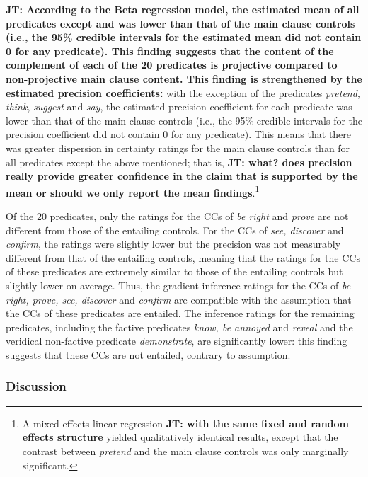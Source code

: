\documentclass[11pt,fleqn]{article}
\newcommand{\6}{\mbox{$[\hspace*{-.6mm}[$}}
\newcommand{\9}{\mbox{$]\hspace*{-.6mm}]$}}
\newcommand{\jt}[1]{\textbf{\color{blue}JT: #1}}
\begin{document}
\jt{According to the Beta regression model, the estimated mean of all predicates except {\em } and {\em } was lower than that of the main clause controls (i.e., the 95\% credible intervals for the estimated mean did not contain 0 for any predicate). This finding suggests that the content of the complement of each of the 20 predicates is projective compared to non-projective main clause content. This finding is strengthened by the estimated precision coefficients:} with the exception of the predicates \emph{pretend},  \emph{think}, \emph{suggest} and \emph{say}, the estimated precision coefficient for each predicate was lower than that of the main clause controls (i.e., the 95\% credible intervals for the precision coefficient did not contain 0 for any predicate). This means that there was greater dispersion in certainty ratings for the main clause controls than for all predicates except the above mentioned; that is, \jt{what? does precision really provide greater confidence in the claim that is supported by the mean or should we only report the mean findings}.\footnote{A mixed effects linear regression \jt{with the same fixed and random effects structure} yielded qualitatively identical results, except that the contrast between \emph{pretend} and the main clause controls was only marginally significant.} 

Of the 20 predicates, only the ratings for the CCs of {\em be right} and {\em prove} are not different from those of the entailing controls. For the CCs of {\em see, discover} and {\em confirm}, the ratings were slightly lower but the precision was not measurably different from that of the entailing controls, meaning that the ratings for the CCs of these predicates are extremely similar to those of the entailing controls but slightly lower on average. Thus, the gradient inference ratings for the CCs of {\em be right, prove, see, discover} and {\em confirm} are compatible with the assumption that the CCs of these predicates are entailed. The inference ratings for the remaining predicates, including the factive predicates {\em know, be annoyed} and {\em reveal} and the veridical non-factive predicate {\em demonstrate}, are significantly lower: this finding suggests that these CCs are not entailed, contrary to assumption. 



\subsubsection{Discussion}
\end{document}
